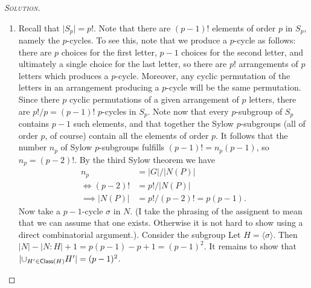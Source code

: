 \begin{proof}[{\scshape Solution}]
  \hfill
  \begin{enumerate}[font=\normalfont,label=\textbf{(\Alph*)}, wide]


    \item Recall that $\lvert S_p \rvert = p!$. Note that there are $(p-1)!$ elements of order $p$ in $S_p$, namely the $p$-cycles. To see this, note that we produce a $p$-cycle as follows: there are $p$ choices for the first letter, $p-1$ choices for the second letter, and ultimately a single choice for the last letter, so there are $p!$ arrangements of $p$ letters which produces a $p$-cycle. Moreover, any cyclic permutation of the letters in an arrangement producing a $p$-cycle will be the same permutation. Since there $p$ cyclic permutations of a given arrangement of $p$ letters, there are $p!/p = (p-1)!$ $p$-cycles in $S_p$. Note now that every $p$-subgroup of $S_p$ contains $p-1$ such elements, and that together the Sylow $p$-subgroups (all of order $p$, of course) contain all the elements of order $p$. It follows that the number $n_p$ of Sylow $p$-subgroups fulfills $(p-1)! = n_p (p-1)$, so $n_p = (p-2)!$. By the third Sylow theorem we have
    \[
    \begin{aligned}
      n_p &= \lvert G \rvert / \lvert N(P)\rvert\\
\iff (p-2)! &= p! / \lvert N(P)\rvert \\
      \implies\lvert N(P)\rvert &= p!/(p-2)! = p(p-1).
    \end{aligned}
    \]
    Now take a $p-1$-cycle $\sigma$ in $N$. (I take the phrasing of the assignent to mean that we can assume that one exists. Otherwise it is not hard to show using a direct combinatorial argument.). Consider the subgroup Let $H = \langle \sigma \rangle$. Then $\lvert N \rvert - \lvert N : H\rvert + 1 = p(p-1) - p + 1 = (p-1)^2$. It remains to show that $\lvert \cup_{H' \in \mathsf{Class}(H)} H' \rvert = (p-1)^2$.

\begin{comment}
    Let $\psi$ be a $p$-cycle generating $P$. In general it holds for subgroups $H, K$ of $N$ that $\lvert HK \rvert = \lvert H\rvert \lvert K \rvert / \lvert H\cap K \rvert$. Therefore $\lvert \langle \sigma \rangle\langle \psi \rangle\rvert  = \lvert \langle \sigma \rangle \rvert\lvert \langle \psi \rangle\rvert/\lvert \langle \sigma \rangle \cap \langle \psi \rangle \rvert = \lvert \langle \sigma \rangle \rvert\lvert \langle \psi \rangle\rvert = p(p-1)$. Hence $N$ is generated by $\sigma$ and $\psi$.
\end{comment}


\end{enumerate}
\end{proof}
